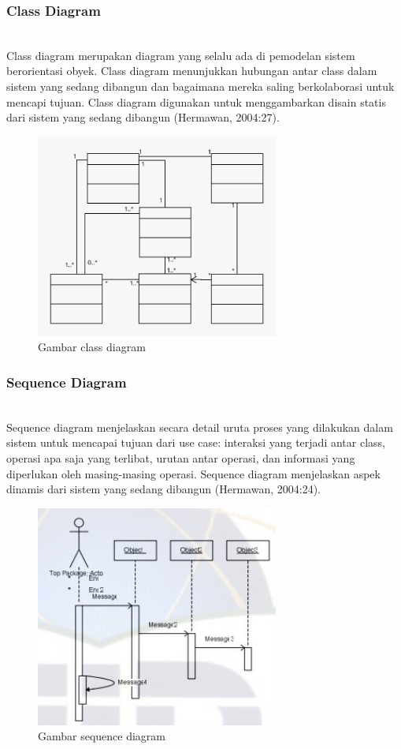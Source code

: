 \subsubsection{Class Diagram}
\hfill\\
Class diagram merupakan diagram yang selalu ada di pemodelan sistem berorientasi obyek. Class diagram menunjukkan hubungan antar class dalam sistem yang sedang dibangun dan bagaimana mereka saling berkolaborasi untuk mencapi tujuan. Class diagram digunakan untuk menggambarkan disain statis dari sistem yang sedang dibangun (Hermawan, 2004:27).
	\begin{figure}[H]
		\includegraphics[width=8cm]{figures/classdiagram.jpg}
		\centering
		\caption{Gambar class diagram}
	\end{figure}
	
\subsubsection{Sequence Diagram}
\hfill\\
Sequence diagram menjelaskan secara detail uruta proses yang dilakukan dalam sistem untuk mencapai tujuan dari use case: interaksi yang terjadi antar class, operasi apa saja yang terlibat, urutan antar operasi, dan informasi yang diperlukan oleh masing-masing operasi. Sequence diagram menjelaskan aspek dinamis dari sistem yang sedang dibangun (Hermawan, 2004:24).
	\begin{figure}[H]
		\includegraphics[width=8cm]{figures/sequence.jpg}
		\centering
		\caption{Gambar sequence diagram}
	\end{figure}

